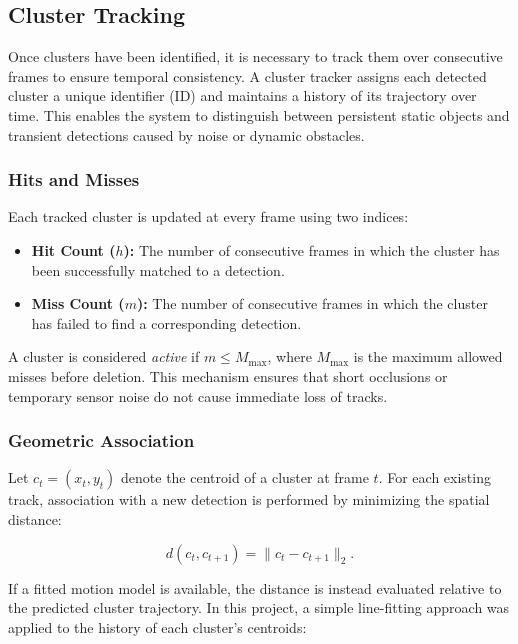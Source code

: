 \subsection{Cluster Tracking}
\label{subsec:cluster_tracking}

Once clusters have been identified, it is necessary to track them over consecutive frames to ensure temporal consistency. 
A cluster tracker assigns each detected cluster a unique identifier (ID) and maintains a history of its trajectory over time. 
This enables the system to distinguish between persistent static objects and transient detections caused by noise or dynamic obstacles.

\subsubsection*{Hits and Misses}
Each tracked cluster is updated at every frame using two indices: 
\begin{itemize}
    \item \textbf{Hit Count ($h$):} The number of consecutive frames in which the cluster has been successfully matched to a detection.
    \item \textbf{Miss Count ($m$):} The number of consecutive frames in which the cluster has failed to find a corresponding detection.
\end{itemize}

A cluster is considered \textit{active} if $m \leq M_{\text{max}}$, where $M_{\text{max}}$ is the maximum allowed misses before deletion. 
This mechanism ensures that short occlusions or temporary sensor noise do not cause immediate loss of tracks.

\subsubsection*{Geometric Association}
Let $c_t = (x_t, y_t)$ denote the centroid of a cluster at frame $t$.  
For each existing track, association with a new detection is performed by minimizing the spatial distance:

\begin{equation}
    d(c_t, c_{t+1}) = \lVert c_t - c_{t+1} \rVert_2.
\end{equation}

If a fitted motion model is available, the distance is instead evaluated relative to the predicted cluster trajectory. 
In this project, a simple line-fitting approach was applied to the history of each cluster’s centroids:


